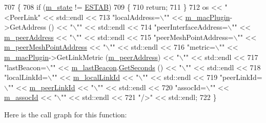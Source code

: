 \begin{DoxyCode}
707 \{
708   \textcolor{keywordflow}{if} (\hyperlink{classns3_1_1dot11s_1_1PeerLink_a787dbb5c8b201a6f0bb92650b67807ef}{m\_state} != \hyperlink{classns3_1_1dot11s_1_1PeerLink_a432024c7d584aebae1ee15aa88ffb06da9d6ed7d5e4a66f2a2964b4b77c1ef728}{ESTAB})
709     \{
710       \textcolor{keywordflow}{return};
711     \}
712   os << \textcolor{stringliteral}{"<PeerLink"} << std::endl <<
713   \textcolor{stringliteral}{"localAddress=\(\backslash\)""} << \hyperlink{classns3_1_1dot11s_1_1PeerLink_a07c267b43c6df4fe43f25caf07d7fd56}{m\_macPlugin}->GetAddress () << \textcolor{stringliteral}{"\(\backslash\)""} << std::endl <<
714   \textcolor{stringliteral}{"peerInterfaceAddress=\(\backslash\)""} << \hyperlink{classns3_1_1dot11s_1_1PeerLink_ab442de76f74778662919cc3d3d51cdd8}{m\_peerAddress} << \textcolor{stringliteral}{"\(\backslash\)""} << std::endl <<
715   \textcolor{stringliteral}{"peerMeshPointAddress=\(\backslash\)""} << \hyperlink{classns3_1_1dot11s_1_1PeerLink_a610c8fd3d7f1c337f912c4a95d7c3dbc}{m\_peerMeshPointAddress} << \textcolor{stringliteral}{"\(\backslash\)""} << std::endl <<
716   \textcolor{stringliteral}{"metric=\(\backslash\)""} << \hyperlink{classns3_1_1dot11s_1_1PeerLink_a07c267b43c6df4fe43f25caf07d7fd56}{m\_macPlugin}->GetLinkMetric (\hyperlink{classns3_1_1dot11s_1_1PeerLink_ab442de76f74778662919cc3d3d51cdd8}{m\_peerAddress}) << \textcolor{stringliteral}{"\(\backslash\)""} << std::endl <<
717   \textcolor{stringliteral}{"lastBeacon=\(\backslash\)""} << \hyperlink{classns3_1_1dot11s_1_1PeerLink_a025e3907d1183e71a14698bea36cf0b0}{m\_lastBeacon}.\hyperlink{classns3_1_1Time_a8f20d5c3b0902d7b4320982f340b57c8}{GetSeconds} () << \textcolor{stringliteral}{"\(\backslash\)""} << std::endl <<
718   \textcolor{stringliteral}{"localLinkId=\(\backslash\)""} << \hyperlink{classns3_1_1dot11s_1_1PeerLink_ae0647b7f17be8e5f3f721cf4c714ab81}{m\_localLinkId} << \textcolor{stringliteral}{"\(\backslash\)""} << std::endl <<
719   \textcolor{stringliteral}{"peerLinkId=\(\backslash\)""} << \hyperlink{classns3_1_1dot11s_1_1PeerLink_af620e2d2607904bc9b5d107aa1524038}{m\_peerLinkId} << \textcolor{stringliteral}{"\(\backslash\)""} << std::endl <<
720   \textcolor{stringliteral}{"assocId=\(\backslash\)""} << \hyperlink{classns3_1_1dot11s_1_1PeerLink_af3a64d46026ef508ab62111008ce4084}{m\_assocId} << \textcolor{stringliteral}{"\(\backslash\)""} << std::endl <<
721   \textcolor{stringliteral}{"/>"} << std::endl;
722 \}
\end{DoxyCode}


Here is the call graph for this function\+:


